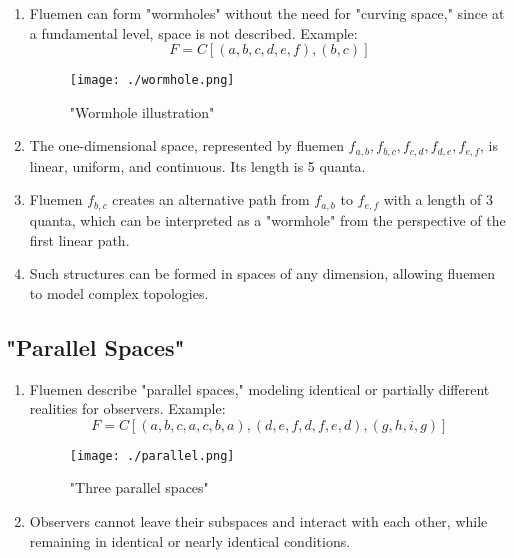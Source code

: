 \documentclass[final]{article}
\begin{document}
            \begin{enumerate}

                \item Fluemen can form "wormholes" without the need for "curving 
                space," since at a fundamental level, space is not described. 
                Example: \[ F = C[(a,b,c,d,e,f),(b,c)] \]

                \begin{figure}[H]
                    \centering
                    \texttt{[image: ./wormhole.png]}
                    \caption{"Wormhole illustration"}
                    \label{fig:image}
                \end{figure}

                \item The one-dimensional space, represented by fluemen 
                \(f_{a,b}, f_{b,c}, f_{c,d}, f_{d,e}, f_{e,f}\), is linear, 
                uniform, and continuous. Its length is 5 quanta.

                \item Fluemen \( f_{b,c} \) creates an alternative path from 
                \(f_{a,b}\) to \(f_{e,f}\) with a length of 3 quanta, which can 
                be interpreted as a "wormhole" from the perspective of the first 
                linear path.

                \item Such structures can be formed in spaces of any dimension, 
                allowing fluemen to model complex topologies.

            \end{enumerate}


        \subsection{"Parallel Spaces"}

            \begin{enumerate}

                \item Fluemen describe "parallel spaces," modeling identical or 
                partially different realities for observers. Example: \[ F = 
                C[(a,b,c,a,c,b,a), (d,e,f,d,f,e,d), (g,h,i,g)] \]

                \begin{figure}[H]
                    \centering
                    \texttt{[image: ./parallel.png]}
                    \caption{"Three parallel spaces"}
                    \label{fig:image}
                \end{figure}

                \item Observers cannot leave their subspaces and interact with 
                each other, while remaining in identical or nearly identical 
                conditions.

            \end{enumerate}
\end{document}
